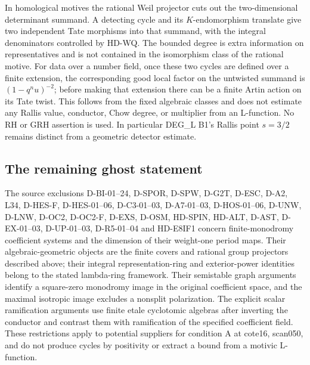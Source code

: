 In homological motives the rational Weil projector cuts out the
two-dimensional determinant summand. A detecting cycle and its
$K$-endomorphism translate give two independent Tate morphisms into
that summand, with the integral denominators controlled by HD-WQ.
The bounded degree is extra information on representatives and is
not contained in the isomorphism class of the rational motive.
For data over a number field, once these two cycles are defined over
a finite extension, the corresponding good local factor on the
untwisted summand is $(1-q^n u)^{-2}$; before making that extension
there can be a finite Artin action on its Tate twist. This follows
from the fixed algebraic classes and does not estimate any Rallis
value, conductor, Chow degree, or multiplier from an L-function.
No RH or GRH assertion is used. In particular DEG\_L B1's Rallis
point $s=3/2$ remains distinct from a geometric detector estimate.

\subsection{The remaining ghost statement}
The source exclusions D-BI-01--24, D-SPOR, D-SPW, D-G2T,
D-ESC, D-A2, L34, D-HES-F, D-HES-01--06, D-C3-01--03, D-A7-01--03, D-HOS-01--06, D-UNW, D-LNW, D-OC2, D-OC2-F, D-EXS, D-OSM, HD-SPIN, HD-ALT, D-AST, D-EX-01--03, D-UP-01--03,
D-R5-01--04 and HD-E8IF1 concern finite-monodromy coefficient
systems and the dimension of their weight-one period maps. Their
algebraic-geometric objects are the finite covers and rational group
projectors described above; their integral representation-ring and
exterior-power identities belong to the stated lambda-ring framework.
Their semistable graph arguments identify a square-zero monodromy
image in the original coefficient space, and the maximal isotropic
image excludes a nonsplit polarization. The explicit scalar
ramification arguments use finite etale cyclotomic algebras after
inverting the conductor and contrast them with ramification of the
specified coefficient field. These restrictions apply to potential
suppliers for condition A at cote16, scan050, and do not produce
cycles by positivity or extract a bound from a motivic L-function.

